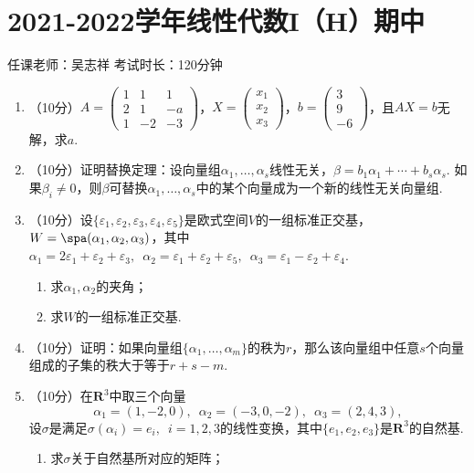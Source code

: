 \section{2021-2022学年线性代数I（H）期中}

\begin{center}
    任课老师：吴志祥\hspace{4em} 考试时长：120分钟
\end{center}
\begin{enumerate}
    \item （10分）$A=\begin{pmatrix}
        1 & 1 & 1 \\ 2 & 1 & -a \\ 1 & -2 & -3
    \end{pmatrix}$，$X=\begin{pmatrix}
        x_1 \\ x_2 \\ x_3
    \end{pmatrix}$，$b=\begin{pmatrix}
        3 \\ 9 \\ -6
    \end{pmatrix}$，且$AX=b$无解，求$a$.
	\item （10分）证明替换定理：设向量组$\alpha_1,\ldots,\alpha_s$线性无关，$\beta=b_1\alpha_1+\cdots+b_s\alpha_s$. 如果$\beta_i\neq 0$，则$\beta$可替换$\alpha_1,\ldots,\alpha_s$中的某个向量成为一个新的线性无关向量组.
	\item （10分）设$\{\varepsilon_1,\varepsilon_2,\varepsilon_3,\varepsilon_4,\varepsilon_5\}$是欧式空间$V$的一组标准正交基，$W=\spa(\alpha_1,\alpha_2,\alpha_3)$，其中$\alpha_1=2\varepsilon_1+\varepsilon_2+\varepsilon_3,\enspace \alpha_2=\varepsilon_1+\varepsilon_2+\varepsilon_5,\enspace \alpha_3=\varepsilon_1-\varepsilon_2+\varepsilon_4$.
	\begin{enumerate}
        \item 求$\alpha_1,\alpha_2$的夹角；

        \item 求$W$的一组标准正交基.
    \end{enumerate}
	\item （10分）证明：如果向量组$\{\alpha_1,\ldots,\alpha_m\}$的秩为$r$，那么该向量组中任意$s$个向量组成的子集的秩大于等于$r+s-m$.
	\item （10分）在$\mathbf{R}^3$中取三个向量
	\[\alpha_1=(1,-2,0),\enspace \alpha_2=(-3,0,-2),\enspace \alpha_3=(2,4,3),\]
    设$\sigma$是满足$\sigma(\alpha_i)=e_i,\enspace i=1,2,3$的线性变换，其中$\{e_1,e_2,e_3\}$是$\mathbf{R}^3$的自然基.
    \begin{enumerate}
        \item 求$\sigma$关于自然基所对应的矩阵；


\end{enumerate}
\end{enumerate}
